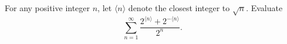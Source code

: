 For any positive integer $n$, let $\langle n\rangle$ denote
the closest integer to $\sqrt{n}$.  Evaluate
\[\sum_{n=1}^\infty \frac{2^{\langle n\rangle}+2^{-\langle n\rangle}}
                         {2^n}.\]
